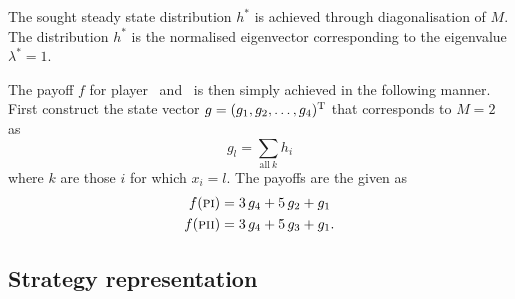 The sought steady state distribution $h^\ast$ is achieved through diagonalisation of $M$. The distribution $h^\ast$ is the normalised eigenvector corresponding to the eigenvalue $\lambda^\ast = 1$.\mypar

The payoff $f$ for player \pone\ and \ptwo\ is then simply achieved in the following manner. First construct the state vector $g = (g_1, g_2, \dots, g_4)^{\mathrm{T}}$ that corresponds to $M = 2$ %
as 
\begin{displaymath}
g_l = \sum_{\mathrm{all~} k } h_i
\end{displaymath}
where $k$ are those $i$ for which $x_i = l$. The payoffs are the given as
\begin{align*}
f(\textsc{pi}) &= 3\, g_4 + 5\, g_2 + g_1 \\
f(\textsc{pii}) &= 3\, g_4 + 5\, g_3 + g_1.
\end{align*}

\subsection{Strategy representation}

